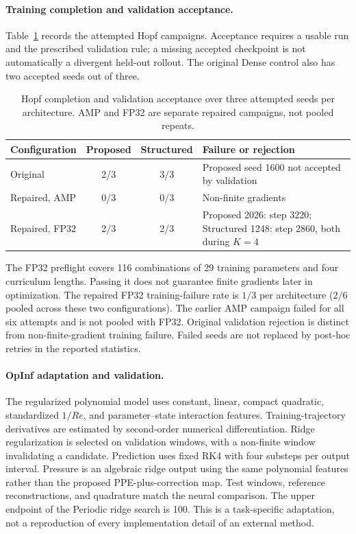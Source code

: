 \paragraph{Training completion and validation acceptance.}
Table~\ref{tab:hopf_completion} records the attempted Hopf campaigns.
Acceptance requires a usable run and the prescribed validation rule;
a missing accepted checkpoint is not automatically a divergent
held-out rollout. The original Dense control also has two accepted
seeds out of three.

\begin{table}[t]
\centering
\small
\caption{Hopf completion and validation acceptance over three
attempted seeds per architecture. AMP and FP32 are separate repaired
campaigns, not pooled repeats.}
\label{tab:hopf_completion}
\begin{tabular}{@{}lccp{5.8cm}@{}}
\toprule
Configuration & Proposed & Structured & Failure or rejection\\
\midrule
Original & 2/3 & 3/3 & Proposed seed 1600 not accepted by validation\\
Repaired, AMP & 0/3 & 0/3 & Non-finite gradients\\
Repaired, FP32 & 2/3 & 2/3 & Proposed 2026: step 3220;
Structured 1248: step 2860, both during $K=4$\\
\bottomrule
\end{tabular}
\end{table}

The FP32 preflight covers 116 combinations of 29 training parameters
and four curriculum lengths. Passing it does not guarantee finite
gradients later in optimization.
The repaired FP32 training-failure rate is $1/3$ per architecture
($2/6$ pooled across these two configurations). The earlier AMP
campaign failed for all six attempts and is not pooled with FP32.
Original validation rejection is distinct from non-finite-gradient
training failure. Failed seeds are not replaced by post-hoc retries
in the reported statistics.

\paragraph{OpInf adaptation and validation.}
The regularized polynomial model uses constant, linear, compact
quadratic, standardized $1/Re$, and parameter--state interaction
features. Training-trajectory derivatives are estimated by
second-order numerical differentiation.
Ridge regularization is selected on validation windows, with a
non-finite window invalidating a candidate.
Prediction uses fixed RK4 with four substeps per output interval.
Pressure is an algebraic ridge output using the same polynomial
features rather than the proposed PPE-plus-correction map.
Test windows, reference reconstructions, and quadrature match the
neural comparison. The upper endpoint of the Periodic ridge search
is 100. This is a task-specific adaptation, not a reproduction of
every implementation detail of an external method.
